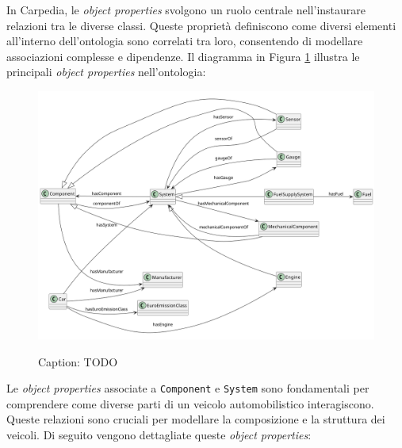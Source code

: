 In Carpedia, le \textit{object properties} svolgono un ruolo centrale nell'instaurare relazioni tra le diverse classi. Queste proprietà definiscono come diversi elementi all'interno dell'ontologia sono correlati tra loro, consentendo di modellare associazioni complesse e dipendenze. Il diagramma in Figura \ref{fig:carpedia-object-properties} illustra le principali \textit{object properties} nell'ontologia:

\begin{figure}[H]
    \caption{Caption: TODO}
    \includegraphics[width=\textwidth]{figures/carpedia-object-properties.png}
    \label{fig:carpedia-object-properties}
\end{figure}

Le \textit{object properties} associate a \texttt{Component} e \texttt{System} sono fondamentali per comprendere come diverse parti di un veicolo automobilistico interagiscono. Queste relazioni sono cruciali per modellare la composizione e la struttura dei veicoli. Di seguito vengono dettagliate queste \textit{object properties}:

